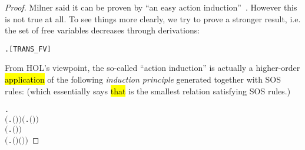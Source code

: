 \begin{proof}
Milner said it can be proven by ``an easy action
induction''~\cite{milner1990operational}. However this is not true at all.
%
To see things more clearly, we try to prove a stronger result,
i.e. the set of free variables decreases through derivations:
\begin{alltt}
\HOLTokenTurnstile{} \HOLSymConst{\HOLTokenForall{}}  .  \HOLTokenTransBegin{}\HOLTokenTransEnd {} \HOLSymConst{\HOLTokenImp{}}   \HOLSymConst{\HOLTokenSubset{}}  \hfill{[TRANS_FV]}
\end{alltt}

From HOL's viewpoint, the so-called ``action induction'' is actually a higher-order \hl{application}
of the following \emph{induction principle} generated together with SOS
rules: (which essentially says \hl{that}  is the smallest relation
satisfying SOS rules.)
\begin{alltt}
\HOLTokenTurnstile{} \HOLSymConst{\HOLTokenForall{}}.
       \ensuremath{(}\HOLSymConst{\HOLTokenForall{}} .  \ensuremath{(}\HOLSymConst{\ensuremath{\ldotp}}\ensuremath{)}  \ensuremath{)} \HOLSymConst{\HOLTokenConj{}} \ensuremath{(}\HOLSymConst{\HOLTokenForall{}}   .     \HOLSymConst{\HOLTokenImp{}}  \ensuremath{(} \HOLSymConst{\ensuremath{+}} \ensuremath{)}  \ensuremath{)} \HOLSymConst{\HOLTokenConj{}}
       \ensuremath{(}\HOLSymConst{\HOLTokenForall{}}   .     \HOLSymConst{\HOLTokenImp{}}  \ensuremath{(} \HOLSymConst{\ensuremath{+}} \ensuremath{)}  \ensuremath{)} \HOLSymConst{\HOLTokenConj{}}
       \ensuremath{(}\HOLSymConst{\HOLTokenForall{}}   .     \HOLSymConst{\HOLTokenImp{}}  \ensuremath{(} \HOLSymConst{\ensuremath{\mid}} \ensuremath{)}  \ensuremath{(} \HOLSymConst{\ensuremath{\mid}} \ensuremath{)}\ensuremath{)} \HOLSymConst{\HOLTokenConj{}}

\end{alltt}
\end{proof}
